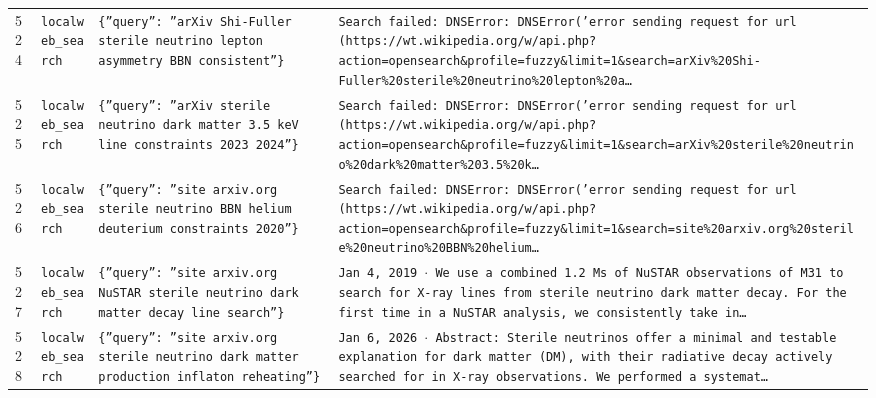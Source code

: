 \documentclass[11pt,a4paper]{article}
\begin{document}
\begin{longtable}{@{}p{}p{}p{}p{}@{}}
524 & \texttt{local}\newline\texttt{web\_\allowbreak{}search} & \texttt{\{''query'':\allowbreak{} ''arXiv Shi-Fuller sterile neutrino lepton asymmetry BBN consistent''\}\allowbreak{}} & \texttt{Search failed:\allowbreak{} DNSError:\allowbreak{} DNSError('error sending request for url (https:\allowbreak{}/\allowbreak{}/\allowbreak{}wt.wikipedia.org/\allowbreak{}w/\allowbreak{}api.php?action=\allowbreak{}opensearch\&profile=\allowbreak{}fuzzy\&limit=\allowbreak{}1\&search=\allowbreak{}arXiv\%20Shi-Fuller\%20sterile\%20neutrino\%20lepton\%20a\ldots{}\allowbreak{}} \\
525 & \texttt{local}\newline\texttt{web\_\allowbreak{}search} & \texttt{\{''query'':\allowbreak{} ''arXiv sterile neutrino dark matter 3.5 keV line constraints 2023 2024''\}\allowbreak{}} & \texttt{Search failed:\allowbreak{} DNSError:\allowbreak{} DNSError('error sending request for url (https:\allowbreak{}/\allowbreak{}/\allowbreak{}wt.wikipedia.org/\allowbreak{}w/\allowbreak{}api.php?action=\allowbreak{}opensearch\&profile=\allowbreak{}fuzzy\&limit=\allowbreak{}1\&search=\allowbreak{}arXiv\%20sterile\%20neutrino\%20dark\%20matter\%203.5\%20k\ldots{}\allowbreak{}} \\
526 & \texttt{local}\newline\texttt{web\_\allowbreak{}search} & \texttt{\{''query'':\allowbreak{} ''site arxiv.org sterile neutrino BBN helium deuterium constraints 2020''\}\allowbreak{}} & \texttt{Search failed:\allowbreak{} DNSError:\allowbreak{} DNSError('error sending request for url (https:\allowbreak{}/\allowbreak{}/\allowbreak{}wt.wikipedia.org/\allowbreak{}w/\allowbreak{}api.php?action=\allowbreak{}opensearch\&profile=\allowbreak{}fuzzy\&limit=\allowbreak{}1\&search=\allowbreak{}site\%20arxiv.org\%20sterile\%20neutrino\%20BBN\%20helium\ldots{}\allowbreak{}} \\
527 & \texttt{local}\newline\texttt{web\_\allowbreak{}search} & \texttt{\{''query'':\allowbreak{} ''site arxiv.org NuSTAR sterile neutrino dark matter decay line search''\}\allowbreak{}} & \texttt{Jan 4,\allowbreak{} 2019 $\cdot$ We use a combined 1.2 Ms of NuSTAR observations of M31 to search for X-ray lines from sterile neutrino dark matter decay. For the first time in a NuSTAR analysis,\allowbreak{} we consistently take in\ldots{}\allowbreak{}} \\
528 & \texttt{local}\newline\texttt{web\_\allowbreak{}search} & \texttt{\{''query'':\allowbreak{} ''site arxiv.org sterile neutrino dark matter production inflaton reheating''\}\allowbreak{}} & \texttt{Jan 6,\allowbreak{} 2026 $\cdot$ Abstract:\allowbreak{} Sterile neutrinos offer a minimal and testable explanation for dark matter (DM)\allowbreak{},\allowbreak{} with their radiative decay actively searched for in X-ray observations. We performed a systemat\ldots{}\allowbreak{}} \\

\end{longtable}
\end{document}

